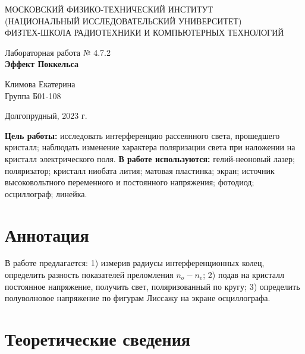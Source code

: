\documentclass[a4paper,12pt]{article} %
\begin{document}
\begin{center}
	\footnotesize{МОСКОВСКИЙ ФИЗИКО-ТЕХНИЧЕСКИЙ ИНСТИТУТ\\(НАЦИОНАЛЬНЫЙ 			ИССЛЕДОВАТЕЛЬСКИЙ УНИВЕРСИТЕТ)}\\
	\footnotesize{ФИЗТЕХ-ШКОЛА РАДИОТЕХНИКИ И КОМПЬЮТЕРНЫХ ТЕХНОЛОГИЙ\\}
	\hfill \break
	\hfill \break
	\hfill \break
	\hfill \break
	\hfill \break
	\hfill \break
\end{center}

\begin{center}   
    \hfill \break
	\hfill \break
	\hfill \break
	\hfill \break
	\hfill \break
	\hfill \break
	\hfill \break
	\hfill \break
	\hfill \break
	\hfill \break
	\hfill \break
	\large{Лабораторная работа № 4.7.2\\\large{\textbf{Эффект Поккельса}}}\\
	\hfill \break
        \hfill \break
	\hfill \break
	\hfill \break
	\hfill \break
	\hfill \break
	\hfill \break
	\hfill \break
	\hfill \break
	\hfill \break
	\hfill \break
	\begin{flushright}
		Климова Екатерина\\
		Группа Б01-108
	\end{flushright}
	\hfill \break
\end{center}
\hfill \break
\hfill \break
\begin{center}
	Долгопрудный, 2023 г.
\end{center}
\thispagestyle{empty}

\newpage
\hfill \break
\textbf{Цель работы:} исследовать интерференцию рассеянного света, прошедшего кристалл; наблюдать изменение характера поляризации света при наложении на кристалл электрического поля.  
\hfill \break
\hfill \break
\textbf{В работе используются:} гелий-неоновый лазер; поляризатор; кристалл ниобата лития; матовая пластинка; экран; источник высоковольтного переменного и постоянного напряжения; фотодиод; осциллограф; линейка.

\section{Аннотация}
\hfill \break В работе предлагается: 1) измерив радиусы интерференционных колец, определить разность показателей преломления $n_{o} - n_{e}$; 2) подав на кристалл постоянное напряжение, получить свет, поляризованный по кругу; 3) определить полуволновое напряжение по фигурам Лиссажу на экране осциллографа.

\section{Теоретические сведения}
\end{document}
